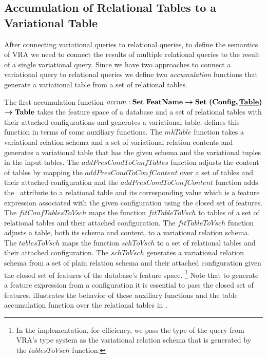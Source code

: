 \subsection{Accumulation of Relational Tables to a Variational Table}
\label{sec:accum}

After connecting variational queries to relational queries, to define the 
semantics of VRA we need to connect
the results of multiple relational queries to the result of a single variational 
query. 
%
Since we have two approaches to connect a variational query to relational queries 
we define two \emph{accumulation} functions that generate a 
variational table from a set of relational tables. 

%
The first accumulation function 
$\mathit{accum} : \settype \fSet \totype \settype {\typepair \confSet \pTabSet}$ $\totype \tabletype$
 takes the feature space of a database and a set of relational
tables with their attached configurations and generates a variational table.  
defines this function in terms of some auxiliary functions. 
%
The $\mathit{mkTable}$ function takes a variational relation schema and a set of 
variational relation contents and generates a variational table that has the given schema
and the variational tuples in the input tables. 
%
The $\mathit{addPresCondToConfTables}$ function adjusts the content of tables by mapping the $\mathit{addPresCondToConfContent}$
over a set of tables and their attached configuration and the  $\mathit{addPresCondToConfContent}$
function adds the \pcatt\ attribute to a relational table and its corresponding value which is 
a feature expression associated with the given configuration using the closed set of
features.
%
The $\mathit{fitConfTablesToVsch}$ maps the function $\mathit{fitTableToVsch}$ to tables of a set of 
relational tables and their attached configuration.
The $\mathit{fitTableToVsch}$ function adjusts a table, both its schema and content, 
to a variational relation schema.
%
The $\mathit{tablesToVsch}$ maps the function $\mathit{schToVsch}$ to a set of 
relational tables and their attached configuration. 
The $\mathit{schToVsch}$ generates a variational relation schema from a set of
plain relation schema and their attached configuration given the closed set of 
features of the database's feature space.%
\footnote{In the implementation, for efficiency, we pass the type of the query from VRA's type system
as the variational relation schema that is generated by the $\mathit{tablesToVsch}$ function.}
%
Note that to generate a feature expression from a configuration it is essential to
pass the closed set of features.
%
 illustrates the behavior of these auxiliary functions and the
table accumulation function over the relational tables in .


